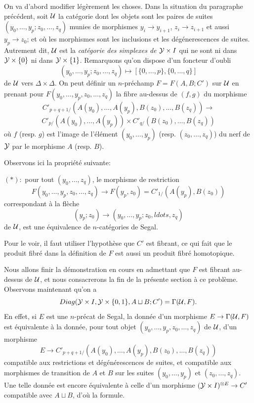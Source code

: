 \documentclass[12pt]{article}
\newcommand{\Uu}{{\cal U}}
\newcommand{\Yy}{{\cal Y}}
\begin{document}
On va d'abord modifier l\'eg\`erement les choses.
Dans la situation du paragraphe
pr\'ec\'edent, soit $\Uu$ la  cat\'egorie dont les objets sont les paires de
suites $(y_0,\ldots , y_p; z_0, \ldots , z_q)$ munies de morphismes
$y_i\rightarrow y_{i+1}$,
$z_i\rightarrow z_{i+1}$ et aussi $y_p\rightarrow z_0$; et o\`u les morphismes
sont les inclusions et les d\'eg\'enerescences de suites.
Autrement dit, $\Uu$ est la {\em cat\'egorie des simplexes de $\Yy \times I$}
qui ne sont ni dans $\Yy \times \{ 0\}$ ni dans $\Yy \times
\{ 1\}$. Remarquons qu'on dispose d'un foncteur d'oubli
$$
(y_0,\ldots , y_p; z_0, \ldots , z_q)\mapsto
[\{ 0,\ldots , p\} , \{ 0,\ldots ,
q\} ]
$$
de
$\Uu$  vers $\Delta \times \Delta$.
On peut d\'efinir
un $n$-pr\'echamp $F = F(A,B; C')$ sur
$\Uu$ en prenant pour
$F(y_0,\ldots , y_p,z_0,\ldots ,z_q)$
la fibre au-dessus de
$(f,g)$ du morphisme
$$
C'_{p+q+1/}(A(y_0),\ldots , A(y_p),B(z_0),\ldots , B(z_q))
\rightarrow
$$
$$
C'_{p/}(A(y_0),\ldots , A(y_p))\times
C'_{q/}(B(z_0),\ldots , B(z_q))
$$
o\`u $f$ (resp. $g$) est l'image de l'\'el\'ement $(y_0,\ldots , y_p)$
(resp. $(z_0,\ldots , z_q)$) du nerf de $\Yy$ par le morphisme $A$ (resp. $B$).


Observons ici la propri\'et\'e suivante:

$(\ast ):$ pour tout $(y_0,\ldots , z_q)$,
le morphisme de restriction
$$
F(y_0,\ldots , y_p,z_0,\ldots ,z_q)\rightarrow F(y_p,z_0)
= C'_{1/}(A(y_p), B(z_0))
$$
correspondant \`a la fl\`eche
$$
(y_p; z_0)\rightarrow (y_0,\ldots ,y_p; z_0,ldots , z_q)
$$
de $\Uu$, est
une \'equivalence de $n$-cat\'egories de Segal.

Pour le voir, il faut utiliser
l'hypoth\`ese que $C'$ est fibrant, ce qui fait que le produit fibr\'e dans
la d\'efinition de $F$ est aussi un produit fibr\'e homotopique.

Nous allons finir la d\'emonstration en cours en admettant
que $F$ est fibrant au-dessus de $\Uu$, et nous consacrerons la fin de
la pr\'esente section \`a ce probl\`eme.
Observons maintenant qu'on a
$$
Diag (\Yy \times I, \Yy \times \{ 0,1\} ,
A\sqcup B ; C') = \Gamma (\Uu , F).
$$
En effet, si $E$ est une
$n$-pr\'ecat de Segal, la donn\'ee d'un morphisme
$E\rightarrow \Gamma (\Uu ,F)$
est \'equivalente \`a la donn\'ee, pour tout objet
$(y_0,\ldots , y_p,z_0,\ldots ,z_q)$ de $\Uu$, d'un morphisme
$$
E\rightarrow
C'_{p+q+1/}(A(y_0),\ldots , A(y_p),B(z_0),\ldots , B(z_q))
$$
compatible aux restrictions et
d\'eg\'en\'erescences de suites,
et compatible aux morphismes de transition de $A$ et $B$
sur les suites $(y_0,\ldots , y_p)$ et $(z_0,\ldots , z_q)$. Une
telle donn\'ee est encore \'equivalente \`a celle d'un
morphisme $(\Yy \times I)^{\otimes E}\rightarrow C'$
compatible avec $A\sqcup B$, d'o\`u la formule.
\end{document}
